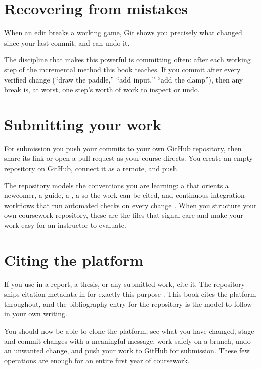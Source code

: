 \section{Recovering from mistakes}

When an edit breaks a working game, Git shows you precisely what changed since your
last commit, and can undo it.



The discipline that makes this powerful is committing often: after each working
step of the incremental method this book teaches. If you commit after every
verified change (``draw the paddle,'' ``add input,'' ``add the clamp''), then any
break is, at worst, one step's worth of work to inspect or undo.

\section{Submitting your work}

For submission you push your commits to your own GitHub repository, then share its
link or open a pull request as your course directs. You create an empty repository
on GitHub, connect it as a remote, and push.



\begin{prgaside}
The \prg repository models the conventions you are learning: a  that
orients a newcomer, a  guide, a , a
 so the work can be cited, and continuous-integration workflows
that run automated checks on every change \citep{prg32repo}. When you structure your
own coursework repository, these are the files that signal care and make your work
easy for an instructor to evaluate.
\end{prgaside}

\section{Citing the platform}

If you use \prg in a report, a thesis, or any submitted work, cite it. The
repository ships citation metadata in  for exactly this purpose
\citep{prg32repo}. This book cites the platform throughout, and the bibliography
entry for the repository is the model to follow in your own writing.

\begin{prgcheck}
You should now be able to clone the platform, see what you have changed, stage and
commit changes with a meaningful message, work safely on a branch, undo an
unwanted change, and push your work to GitHub for submission. These few operations
are enough for an entire first year of coursework.
\end{prgcheck}
